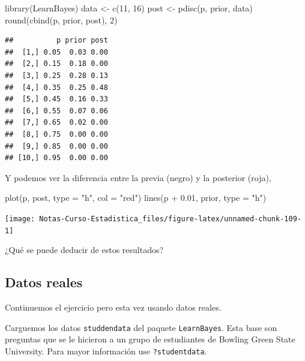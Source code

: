 \documentclass[
  12pt,
]{book}
\newenvironment{Shaded}{\begin{snugshade}}{\end{snugshade}}
\newcommand{\AttributeTok}[1]{\textcolor[rgb]{0.77,0.63,0.00}{#1}}
\newcommand{\DecValTok}[1]{\textcolor[rgb]{0.00,0.00,0.81}{#1}}
\newcommand{\FloatTok}[1]{\textcolor[rgb]{0.00,0.00,0.81}{#1}}
\newcommand{\FunctionTok}[1]{\textcolor[rgb]{0.00,0.00,0.00}{#1}}
\newcommand{\NormalTok}[1]{#1}
\newcommand{\OtherTok}[1]{\textcolor[rgb]{0.56,0.35,0.01}{#1}}
\newcommand{\SpecialCharTok}[1]{\textcolor[rgb]{0.00,0.00,0.00}{#1}}
\newcommand{\StringTok}[1]{\textcolor[rgb]{0.31,0.60,0.02}{#1}}
\theoremstyle{definition}
\theoremstyle{definition}
\theoremstyle{definition}
\theoremstyle{remark}
\begin{document}
\begin{Shaded}
\begin{Highlighting}[]
\FunctionTok{library}\NormalTok{(LearnBayes)}
\NormalTok{data }\OtherTok{\textless{}{-}} \FunctionTok{c}\NormalTok{(}\DecValTok{11}\NormalTok{, }\DecValTok{16}\NormalTok{)}
\NormalTok{post }\OtherTok{\textless{}{-}} \FunctionTok{pdisc}\NormalTok{(p, prior, data)}
\FunctionTok{round}\NormalTok{(}\FunctionTok{cbind}\NormalTok{(p, prior, post), }\DecValTok{2}\NormalTok{)}
\end{Highlighting}
\end{Shaded}

\begin{verbatim}
##          p prior post
##  [1,] 0.05  0.03 0.00
##  [2,] 0.15  0.18 0.00
##  [3,] 0.25  0.28 0.13
##  [4,] 0.35  0.25 0.48
##  [5,] 0.45  0.16 0.33
##  [6,] 0.55  0.07 0.06
##  [7,] 0.65  0.02 0.00
##  [8,] 0.75  0.00 0.00
##  [9,] 0.85  0.00 0.00
## [10,] 0.95  0.00 0.00
\end{verbatim}

Y podemos ver la diferencia entre la previa (negro) y la posterior
(roja),

\begin{Shaded}
\begin{Highlighting}[]
\FunctionTok{plot}\NormalTok{(p, post, }\AttributeTok{type =} \StringTok{"h"}\NormalTok{, }\AttributeTok{col =} \StringTok{"red"}\NormalTok{)}
\FunctionTok{lines}\NormalTok{(p }\SpecialCharTok{+} \FloatTok{0.01}\NormalTok{, prior, }\AttributeTok{type =} \StringTok{"h"}\NormalTok{)}
\end{Highlighting}
\end{Shaded}

\begin{center}\texttt{[image: Notas-Curso-Estadistica\_files/figure-latex/unnamed-chunk-109-1]} \end{center}

¿Qué se puede deducir de estos resultados?

\hypertarget{datos-reales}{%
\subsection{Datos reales}\label{datos-reales}}

Continuemos el ejercicio pero esta vez usando datos reales.

Carguemos los datos \texttt{studdendata} del paquete \texttt{LearnBayes}. Esta base
son preguntas que se le hicieron a un grupo de estudiantes de Bowling
Green State University. Para mayor información use \texttt{?studentdata}.
\end{document}
